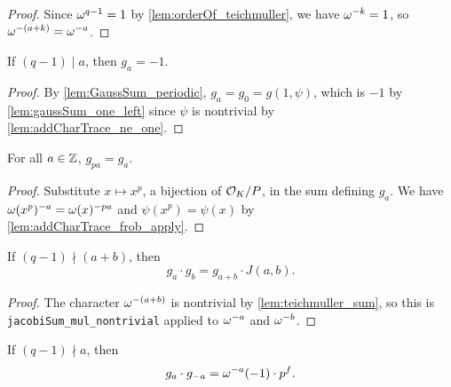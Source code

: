\begin{proof}
  \leanok
  Since $\omega^{q-1} = 1$ by \ref{lem:orderOf_teichmuller}, we have $\omega^{-k} = 1$, so
  $\omega^{-(a+k)} = \omega^{-a}$.
\end{proof}

\begin{lemma}
  \label{lem:gaussSum_of_dvd}
  \leanok
  If $(q-1) \mid a$, then $g_a = -1$.
\end{lemma}

\begin{proof}
  \leanok
  By \ref{lem:GaussSum_periodic}, $g_a = g_0 = g(1, \psi)$, which is $-1$ by
  \ref{lem:gaussSum_one_left} since $\psi$ is nontrivial by \ref{lem:addCharTrace_ne_one}.
\end{proof}

\begin{lemma}
  \label{lem:GaussSum_frob}
  \leanok
  For all $a \in \mathbb{Z}$, $g_{pa} = g_a$.
\end{lemma}

\begin{proof}
  \leanok
  Substitute $x \mapsto x^p$, a bijection of $\mathcal{O}_K/P$, in the sum defining $g_a$. We have
  $\omega(x^p)^{-a} = \omega(x)^{-pa}$ and $\psi(x^p) = \psi(x)$ by
  \ref{lem:addCharTrace_frob_apply}.
\end{proof}

\begin{lemma}
  \label{lem:GaussSum_mul_GaussSum}
  \leanok
  If $(q-1) \nmid (a+b)$, then
  \[
    g_a \cdot g_b = g_{a+b} \cdot J(a, b).
  \]
\end{lemma}

\begin{proof}
  \leanok
  The character $\omega^{-(a+b)}$ is nontrivial by \ref{lem:teichmuller_sum}, so this is
  \texttt{jacobiSum\_mul\_nontrivial} applied to $\omega^{-a}$ and $\omega^{-b}$.
\end{proof}

\begin{lemma}
  \label{lem:GaussSum_mul_GaussSum_neg}
  \leanok
  If $(q-1) \nmid a$, then
  \[
    g_a \cdot g_{-a} = \omega^{-a}(-1) \cdot p^f.
  \]
\end{lemma}

